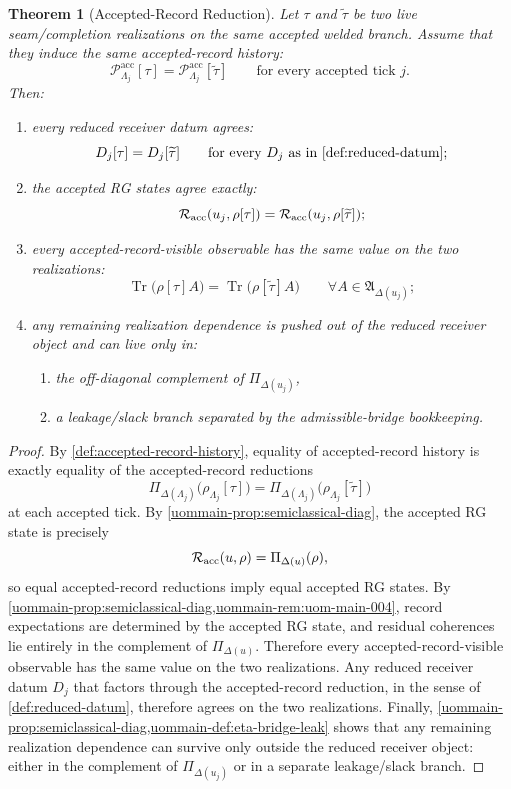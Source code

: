 \documentclass[11pt]{article}
\newtheorem{theorem}{Theorem}
\theoremstyle{definition}
\newcommand{\Tr}{\operatorname{Tr}}
\begin{document}
\begin{theorem}[Accepted-Record Reduction]
\label{thm:accepted-record-reduction}
Let \(\tau\) and \(\widetilde\tau\) be two live seam/completion realizations on the same accepted welded
branch.
Assume that they induce the same accepted-record history:
\[
\mathcal P^{\mathrm{acc}}_{\Lambda_j}[\tau]
=
\mathcal P^{\mathrm{acc}}_{\Lambda_j}[\widetilde\tau]
\qquad
\text{for every accepted tick } j.
\]
Then:
\begin{enumerate}[leftmargin=2em,label=(R\arabic*)]
\item every reduced receiver datum agrees:
  \[
  D_j[\tau]=D_j[\widetilde\tau]
  \qquad
  \text{for every } D_j \text{ as in \cref{def:reduced-datum}};
  \]
\item the accepted RG states agree exactly:
  \[
  \mathcal R_{\rm acc}(u_j,\rho[\tau])
  =
  \mathcal R_{\rm acc}(u_j,\rho[\widetilde\tau]);
  \]
\item every accepted-record-visible observable has the same value on the two realizations:
  \[
  \Tr\!\big(\rho[\tau]A\big)
  =
  \Tr\!\big(\rho[\widetilde\tau]A\big)
  \qquad
  \forall A\in\mathfrak A_{\Delta(u_j)};
  \]
\item any remaining realization dependence is pushed out of the reduced receiver object and can live
  only in:
  \begin{enumerate}[leftmargin=2em,label=(\alph*)]
  \item the off-diagonal complement of \(\Pi_{\Delta(u_j)}\),
  \item a leakage/slack branch separated by the admissible-bridge bookkeeping.
  \end{enumerate}
\end{enumerate}
\end{theorem}

\begin{proof}
By \cref{def:accepted-record-history}, equality of accepted-record history is exactly equality of the
accepted-record reductions
\[
\Pi_{\Delta(\Lambda_j)}\!\big(\rho_{\Lambda_j}[\tau]\big)
=
\Pi_{\Delta(\Lambda_j)}\!\big(\rho_{\Lambda_j}[\widetilde\tau]\big)
\]
at each accepted tick.
By \cref{uommain-prop:semiclassical-diag}, the accepted RG state is precisely
\[
\mathcal R_{\rm acc}(u,\rho)=\Pi_{\Delta(u)}(\rho),
\]
so equal accepted-record reductions imply equal accepted RG states.
By \cref{uommain-prop:semiclassical-diag,uommain-rem:uom-main-004}, record expectations are
determined by the accepted RG state, and residual coherences lie entirely in the complement of
\(\Pi_{\Delta(u)}\).
Therefore every accepted-record-visible observable has the same value on the two realizations.
Any reduced receiver datum \(D_j\) that factors through the accepted-record reduction, in the sense of
\cref{def:reduced-datum}, therefore agrees on the two realizations.
Finally, \cref{uommain-prop:semiclassical-diag,uommain-def:eta-bridge-leak} shows that any remaining
realization dependence can survive only outside the reduced receiver object: either in the complement
of \(\Pi_{\Delta(u_j)}\) or in a separate leakage/slack branch.
\end{proof}
\end{document}
